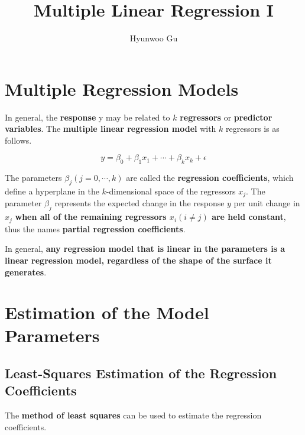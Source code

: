 \documentclass[12pt]{article}
\begin{document}
\title{\textbf{Multiple Linear Regression I}}
\author{Hyunwoo Gu}
\date{}

\maketitle


\section{Multiple Regression Models}

In general, the \textbf{response} y may be related to $k$ \textbf{regressors} or \textbf{predictor variables}. The \textbf{multiple linear regression model} with $k$ regressors is as follows.  

$$
y = \beta_0 + \beta_1 x_1 + \cdots + \beta_k x_k + \epsilon
$$

The parameters $\beta_j (j=0, \cdots, k)$ are called the \textbf{regression coefficients}, which define a hyperplane in the $k$-dimensional space of the regressors $x_j$. The parameter $\beta_j$ represents the expected change in the response $y$ per unit change in $x_j$ \textbf{when all of the remaining regressors $x_i (i \neq j)$ are held constant}, thus the names \textbf{partial regression coefficients}.  

In general, \textbf{any regression model that is linear in the parameters is a linear regression model, regardless of the shape of the surface it generates}.  


\pagebreak
\section{Estimation of the Model Parameters}

\subsection{Least-Squares Estimation of the Regression Coefficients}

The \textbf{method of least squares} can be used to estimate the regression coefficients. 
\end{document}
